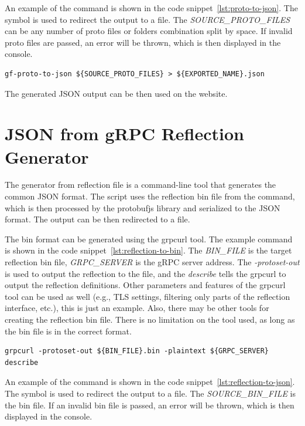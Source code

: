 An example of the command is shown in the code snippet~\ref{lst:proto-to-json}.
The symbol \textit{\>} is used to redirect the output to a file.
The \textit{SOURCE\_PROTO\_FILES} can be any number of proto files or folders combination split by space.
If invalid proto files are passed, an error will be thrown, which is then displayed in the console.

\begin{lstlisting}[caption={proto-to-json command example}, label={lst:proto-to-json}]
gf-proto-to-json ${SOURCE_PROTO_FILES} > ${EXPORTED_NAME}.json
\end{lstlisting}

The generated JSON output can be then used on the website.


\section{JSON from gRPC Reflection Generator}
The generator from reflection file is a command-line tool that generates the common JSON format.
The script uses the reflection bin file from the command, which is then processed by the protobufjs library and serialized to the JSON format.
The output can be then redirected to a file.

The bin format can be generated using the grpcurl tool.
The example command is shown in the code snippet~\ref{lst:reflection-to-bin}.
The \textit{BIN\_FILE} is the target reflection bin file, \textit{GRPC\_SERVER} is the gRPC server address.
The \textit{-protoset-out} is used to output the reflection to the file, and the \textit{describe} tells the grpcurl to output the reflection definitions.
Other parameters and features of the grpcurl tool can be used as well (e.g., TLS settings, filtering only parts of the reflection interface, etc.), this is just an example.
Also, there may be other tools for creating the reflection bin file.
There is no limitation on the tool used, as long as the bin file is in the correct format.

\begin{lstlisting}[caption={proto-to-json command example}, label={lst:reflection-to-bin}]
grpcurl -protoset-out ${BIN_FILE}.bin -plaintext ${GRPC_SERVER} describe
\end{lstlisting}

An example of the command is shown in the code snippet~\ref{lst:reflection-to-json}.
The symbol \textit{\>} is used to redirect the output to a file.
The \textit{SOURCE\_BIN\_FILE} is the bin file.
If an invalid bin file is passed, an error will be thrown, which is then displayed in the console.

